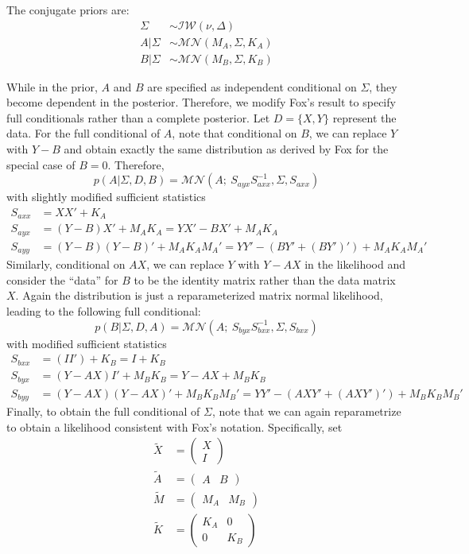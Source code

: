 \documentclass[12pt]{article}
\begin{document}
The conjugate priors are:
\begin{align*}
\Sigma&\sim\mathcal{IW}(\nu,\Delta)\\
A|\Sigma&\sim\mathcal{MN}(M_A,\Sigma,K_A)\\
B|\Sigma&\sim\mathcal{MN}(M_B,\Sigma,K_B)
\end{align*}

While in the prior, $A$ and $B$ are specified as independent conditional on $\Sigma$, they become dependent in the posterior. Therefore, we modify Fox's result to specify full conditionals rather than a complete posterior. Let $D=\{X,Y\}$ represent the data. For the full conditional of $A$, note that conditional on $B$, we can replace $Y$ with $Y-B$ and obtain exactly the same distribution as derived by Fox for the special case of $B=0$. Therefore,
\[p(A|\Sigma,D,B)=\mathcal{MN}\left(A;~S_{ayx}S^{-1}_{axx},\Sigma,S_{axx}\right)\]
with slightly modified sufficient statistics
\begin{align*}
S_{axx} &= XX'+K_A\\
S_{ayx} &= (Y-B)X'+M_A K_A = YX'-BX'+M_A K_A\\
S_{ayy} &= (Y-B)(Y-B)'+M_A K_A M_A' = YY'-\left(BY'+(BY')'\right)+M_A K_A M_A'
\end{align*}
Similarly, conditional on $AX$, we can replace $Y$ with $Y-AX$ in the likelihood and consider the ``data'' for $B$ to be the identity matrix rather than the data matrix $X$. Again the distribution is just a reparameterized matrix normal likelihood, leading to the following full conditional:
\[p(B|\Sigma,D,A) = \mathcal{MN}\left(A;~S_{byx}S^{-1}_{bxx},\Sigma,S_{bxx}\right)\]
with modified sufficient statistics
\begin{align*}
S_{bxx} &= (II')+K_B = I+K_B\\
S_{byx} &= (Y-AX)I'+M_B K_B = Y-AX+M_B K_B\\
S_{byy} &= (Y-AX)(Y-AX)'+M_B K_B M_B' = YY' - \left(AXY'+(AXY')'\right)+M_B K_B M_B'
\end{align*}
Finally, to obtain the full conditional of $\Sigma$, note that we can again reparametrize to obtain a likelihood consistent with Fox's notation. Specifically, set
\begin{align*}
\tilde{X}&=\begin{pmatrix}X\\I\end{pmatrix}\\
\tilde{A}&=\begin{pmatrix}A & B\end{pmatrix}\\
\tilde{M}&=\begin{pmatrix}M_A & M_B\end{pmatrix}\\
\tilde{K}&=\begin{pmatrix}K_A & 0\\ 0 & K_B\end{pmatrix}
\end{align*}
\end{document}
